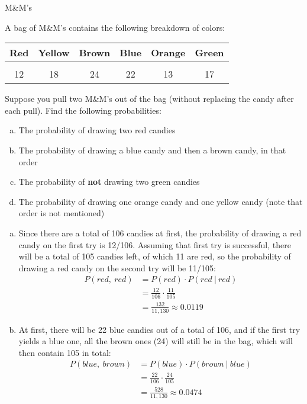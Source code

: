 \begin{example}[https://www.youtube.com/watch?v=7Xe9xjXlC3A]{M\&M's}

A bag of M\&M's contains the following breakdown of colors:

\begin{center}
\begin{tabular}{c c c c c c}
\textbf{Red} & \textbf{Yellow} &  \textbf{Brown} & \textbf{Blue} & \textbf{Orange} & \textbf{Green} \\ \hline
& & & & & \\
12 & 18 & 24 &  22 &  13 & 17 \\
\end{tabular}
\end{center}
Suppose you pull two M\&M's out of the bag (without replacing the candy after each pull). Find the following probabilities:
\begin{enumerate}[(a)]
\item The probability of drawing two red candies
\item The probability of drawing a blue candy and then a brown candy, in that order
\item The probability of \textbf{not} drawing two green candies
\item The probability of drawing one orange candy and one yellow candy (note that order is not mentioned)
\end{enumerate}
\pagebreak

\sol
\begin{enumerate}[(a)]
\item Since there are a total of 106 candies at first, the probability of drawing a red candy on the first try is 12/106.  Assuming that first try is successful, there will be a total of 105 candies left, of which 11 are red, so the probability of drawing a red candy on the second try will be 11/105:
\begin{align*}
P(red,\ red) &= P(red) \cdot P(red\ |\ red)\\
&= \frac{12}{106} \cdot \frac{11}{105}\\
&= \boxed{\frac{132}{11,130} \approx 0.0119}
\end{align*}

\item At first, there will be 22 blue candies out of a total of 106, and if the first try yields a blue one, all the brown ones (24) will still be in the bag, which will then contain 105 in total:
\begin{align*}
P(blue,\ brown) &= P(blue) \cdot P(brown \ | \ blue)\\
&= \frac{22}{106} \cdot \frac{24}{105}\\
&= \boxed{\frac{528}{11,130} \approx 0.0474}
\end{align*}


\end{enumerate}
\end{example}
